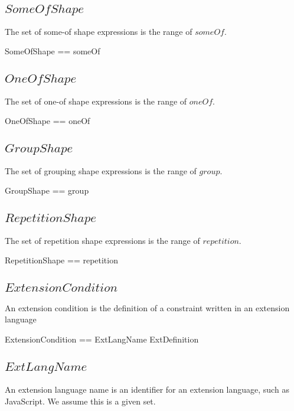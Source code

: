 \documentclass{article}
\begin{document}
\subsection{$SomeOfShape$}
The set of some-of shape expressions is the range of $someOf$.
\begin{zed}
	SomeOfShape == \ran someOf
\end{zed}

\subsection{$OneOfShape$}
The set of one-of shape expressions is the range of $oneOf$.
\begin{zed}
	OneOfShape == \ran oneOf
\end{zed}

\subsection{$GroupShape$}
The set of grouping shape expressions is the range of $group$.
\begin{zed}
	GroupShape == \ran group
\end{zed}

\subsection{$RepetitionShape$}
The set of repetition shape expressions is the range of $repetition$.
\begin{zed}
	RepetitionShape == \ran repetition
\end{zed}

\subsection{$ExtensionCondition$}
An extension condition is the definition of a constraint written in an extension language
\begin{zed}
	ExtensionCondition == ExtLangName \cross ExtDefinition
\end{zed}

\subsection{$ExtLangName$}
An extension language name is an identifier for an extension language, such as JavaScript.
We assume this is a given set.
\begin{zed}
	[ExtLangName]
\end{zed}
\end{document}
